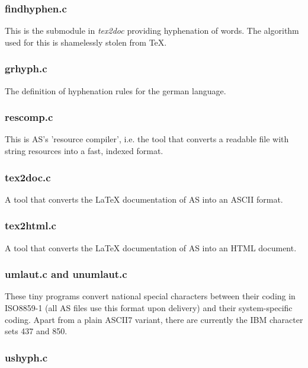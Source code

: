 \documentclass[12pt,twoside]{report}
\newcommand{\asname}{{AS}}
\begin{document}
\subsubsection{findhyphen.c}

This is the submodule in {\em tex2doc} providing hyphenation of words.
The algorithm used for this is shamelessly stolen from TeX.

\subsubsection{grhyph.c}

The definition of hyphenation rules for the german language.

\subsubsection{rescomp.c}

This is \asname{}'s 'resource compiler', i.e. the tool that converts a readable
file with string resources into a fast, indexed format.

\subsubsection{tex2doc.c}

A tool that converts the LaTeX documentation of \asname{} into an ASCII format.

\subsubsection{tex2html.c}

A tool that converts the LaTeX documentation of \asname{} into an HTML document.

\subsubsection{umlaut.c and unumlaut.c}

These tiny programs convert national special characters between their
coding in ISO8859-1 (all \asname{} files use this format upon delivery) and their
system-specific coding.  Apart from a plain ASCII7 variant, there are
currently the IBM character sets 437 and 850.

\subsubsection{ushyph.c}
\end{document}
